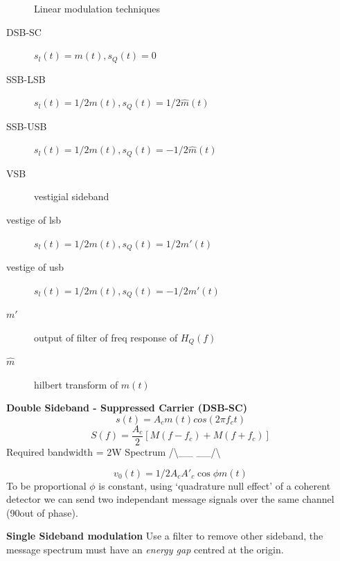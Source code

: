 \documentclass[a4paper,12pt]{article}
\begin{document}
\begin{multicols}{2}
\begin{description}
\item[] Linear modulation techniques
\item[DSB-SC] $s_l(t) = m(t) , s_Q(t) = 0$
\item[SSB-LSB] $s_l(t) = 1/2 m(t) , s_Q(t) = 1/2\hat m(t)$
\item[SSB-USB]$s_l(t) = 1/2 m(t) , s_Q(t) = - 1/2\hat m(t)$
\item[VSB] vestigial sideband
\item[vestige of lsb]$s_l(t) = 1/2 m(t) , s_Q(t) =  1/2m'(t)$
\item[vestige of usb]$s_l(t) = 1/2 m(t) , s_Q(t) = - 1/2m'(t)$
\item[$m'$] output of filter of freq response of $H_Q(f)$
\item[$\hat m$] hilbert transform of $m(t)$
\end{description}

\textbf{Double Sideband - Suppressed Carrier (DSB-SC)}
\[s(t) = A_c m(t) cos(2\pi f_c t)\]
\[S(f) = \frac{A_c}{2}[M(f-f_c)+M(f+f_c)]\]
Required bandwidth = 2W
Spectrum  /\textbackslash \_\_ \textbar \_\_/\textbackslash

\[v_0(t) = 1/2 A_cA'_c \cos \phi m(t)\]
To be proportional $\phi$ is constant, using `quadrature null effect' of a
coherent detector we can send two independant message signals over the same
channel (90\textdegree out of phase).

\textbf{Single Sideband modulation}
Use a filter to remove other sideband, the message spectrum must have an
\emph{energy gap} centred at the origin.



\end{multicols}
\end{document}
